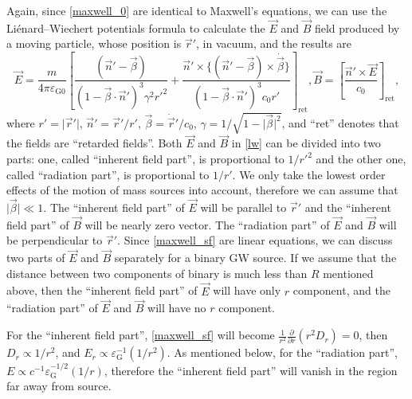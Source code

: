 \documentclass{article}
\def\p{\partial}
\begin{document}
Again, since \eqref{maxwell_0} are identical to Maxwell's equations, we can use the Li\'enard--Wiechert potentials formula to calculate the $\vec{E}$ and $\vec{B}$ field produced by a moving particle, whose position is $\vec{r}'$, in vacuum, and the results are
\begin{equation}\label{lw}
    \vec{E}=\frac{m}{4 \pi \varepsilon_{\text{G}0}}\left[\frac{(\vec{n}'-\vec{\beta})}{(1-\vec{\beta} \cdot \vec{n}')^{3} \gamma^{2} {r'}^{2}}+\frac{\vec{n}' \times\{(\vec{n}'-\vec{\beta}) \times \dot{\vec{\beta}}\}}{(1-\vec{\beta} \cdot \vec{n}')^{3} c_0 r'}\right]_{\text{ret}},\vec{B}=\left[\frac{\vec{n}'\times \vec{E}}{c_0}\right]_{\text{ret}},
\end{equation}
where $r'=\lvert\vec{r}'\rvert$, $\vec{n}'=\vec{r}'/r'$, $\vec{\beta}=\dot{\vec{r}}'/c_0$, $\gamma=1/\sqrt{1-\lvert\vec{\beta}\rvert^2}$, and ``ret'' denotes that the fields are ``retarded fields''. Both $\vec{E}$ and $\vec{B}$ in \eqref{lw} can be divided into two parts: one, called ``inherent field part'', is proportional to $1/r'^2$ and the other one, called ``radiation part'', is proportional to $1/r'$. We only take the lowest order effects of the motion of mass sources into account, therefore we can assume that $\lvert\vec{\beta}\rvert\ll 1$. The ``inherent field part'' of $\vec{E}$ will be parallel to $\vec{r}'$ and the ``inherent field part'' of $\vec{B}$ will be nearly zero vector. The ``radiation part'' of $\vec{E}$ and $\vec{B}$ will be perpendicular to $\vec{r}'$. Since \eqref{maxwell_sf} are linear equations, we can discuss two parts of $\vec{E}$ and $\vec{B}$ separately for a binary GW source. If we assume that the distance between two components of binary is much less than $R$ mentioned above, then the ``inherent field part'' of $\vec{E}$ will have only $r$ component, and the ``radiation part'' of $\vec{E}$ and $\vec{B}$ will have no $r$ component.

For the ``inherent field part'', \eqref{maxwell_sf} will become $\frac{1}{r^2}\frac{\p}{\p r}(r^2 D_r)=0$, then $D_r\propto 1/r^2$, and $E_r\propto \varepsilon_{\text{G}}^{-1}(1/r^2)$. As mentioned below, for the ``radiation part'', $E\propto c^{-1}\varepsilon_{\text{G}}^{-1/2}(1/r)$, therefore the ``inherent field part'' will vanish in the region far away from source.
\end{document}
